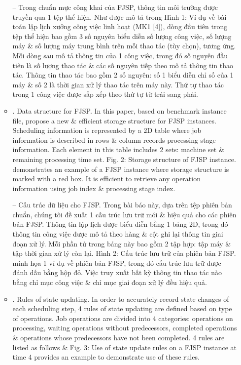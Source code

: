 \documentclass{article}
\begin{document}
\begin{itemize}
\begin{itemize}
        -- Trong chuẩn mực công khai của FJSP, thông tin môi trường được truyền qua 1 tệp thể hiện. Như được mô tả trong {\sf Hình 1: Ví dụ về bài toán lập lịch xưởng công việc linh hoạt (MK1 [4])}, dòng đầu tiên trong tệp thể hiện bao gồm 3 số nguyên biểu diễn số lượng công việc, số lượng máy \& số lượng máy trung bình trên mỗi thao tác (tùy chọn), tương ứng. Mỗi dòng sau mô tả thông tin của 1 công việc, trong đó số nguyên đầu tiên là số lượng thao tác \& các số nguyên tiếp theo mô tả thông tin thao tác. Thông tin thao tác bao gồm 2 số nguyên: số 1 biểu diễn chỉ số của 1 máy \& số 2 là thời gian xử lý thao tác trên máy này. Thứ tự thao tác trong 1 công việc được sắp xếp theo thứ tự từ trái sang phải.
        \item {. Data structure for FJSP.} In this paper, based on benchmark instance file, propose a new \& efficient storage structure for FJSP instances. Scheduling information is represented by a 2D table where job information is described in rows \& column records processing stage information. Each element in this table includes 2 sets: machine set \& remaining processing time set. {\sf Fig. 2: Storage structure of FJSP instance.} demonstrates an example of a FJSP instance where storage structure is marked with a red box. It is efficient to retrieve any operation information using job index \& processing stage index.

        -- {\sf Cấu trúc dữ liệu cho FJSP.} Trong bài báo này, dựa trên tệp phiên bản chuẩn, chúng tôi đề xuất 1 cấu trúc lưu trữ mới \& hiệu quả cho các phiên bản FJSP. Thông tin lập lịch được biểu diễn bằng 1 bảng 2D, trong đó thông tin công việc được mô tả theo hàng \& cột ghi lại thông tin giai đoạn xử lý. Mỗi phần tử trong bảng này bao gồm 2 tập hợp: tập máy \& tập thời gian xử lý còn lại. {\sf Hình 2: Cấu trúc lưu trữ của phiên bản FJSP.} minh họa 1 ví dụ về phiên bản FJSP, trong đó cấu trúc lưu trữ được đánh dấu bằng hộp đỏ. Việc truy xuất bất kỳ thông tin thao tác nào bằng chỉ mục công việc \& chỉ mục giai đoạn xử lý đều hiệu quả.
        \item {. Rules of state updating.} In order to accurately record state changes of each scheduling step, 4 rules of state updating are defined based on type of operations. Job operations are divided into 4 categories: operations on processing, waiting operations without predecessors, completed operations \& operations whose predecessors have not been completed. 4 rules are listed as follows \& {\sf Fig. 3: Use of state update rules on a FJSP instance at time 4} provides an example to demonstrate use of these rules.


\end{itemize}
\end{itemize}
\end{document}
